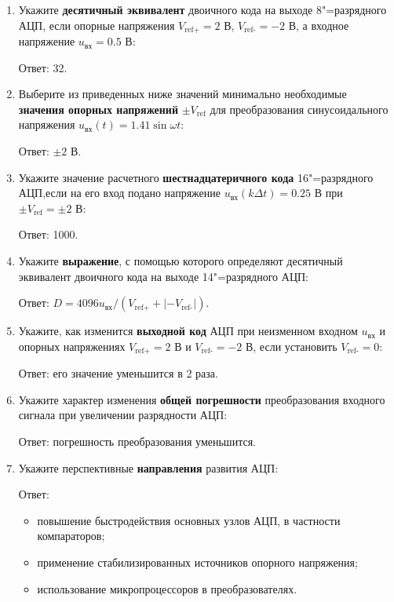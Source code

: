 \documentclass[spec, och, labwork]{shiza}
\begin{document}
\begin{enumerate}
    \item
        Укажите \textbf{десятичный эквивалент} двоичного кода на выходе
        8"=разрядного АЦП, если опорные напряжения $V_\text{ref+} = 2$ В,
        $V_\text{ref-} = -2$ В, а входное напряжение $u_\text{вх} = 0.5$ В:

        Ответ: 32.

    \item
        Выберите из приведенных ниже значений минимально необходимые
        \textbf{значения опорных напряжений} $\pm V_\text{ref}$ для
        преобразования синусоидального напряжения $u_\text{вх}(t) = 1.41 \sin
        \omega t$:
    
        Ответ: $\pm 2$ В.

    \item
        Укажите значение расчетного \textbf{шестнадцатеричного кода}
        16"=разрядного АЦП,если на его вход подано напряжение $u_\text{вх}(k
        \Delta t) = 0.25$ В при $\pm V_\text{ref} = \pm 2$ В:
    
        Ответ: 1000.

    \item
        Укажите \textbf{выражение}, с помощью которого определяют
        десятичный эквивалент двоичного кода на выходе 14"=разрядного АЦП:

        Ответ: $D = 4096 u_\text{вх} / (V_\text{ref+} + |-V_\text{ref-}|)$.
    
    \item
        Укажите, как изменится \textbf{выходной код} АЦП при неизменном
        входном $u_\text{вх}$ и опорных напряжениях $V_\text{ref+} = 2$ В и
        $V_\text{ref-} = -2$ В, если установить $V_\text{ref-} = 0$:
    
        Ответ: его значение уменьшится в 2 раза.

    \item
        Укажите характер изменения \textbf{общей погрешности}
        преобразования входного сигнала при увеличении разрядности АЦП:
    
        Ответ: погрешность преобразования уменьшится.
 
    \item
        Укажите перспективные \textbf{направления} развития АЦП:
    
        Ответ:

        \begin{itemize}
            \item повышение быстродействия основных узлов АЦП, в частности компараторов;
            \item применение стабилизированных источников опорного напряжения;
            \item использование микропроцессоров в преобразователях.
        \end{itemize}


\end{enumerate}
\end{document}
